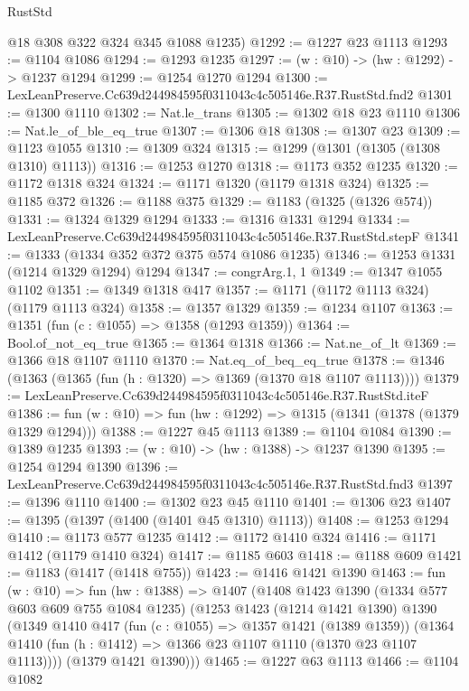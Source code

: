 \begin{lexlean}{RustStd}
\begin{coremodule}
      @18
      @308
      @322
      @324
      @345
      @1088
      @1235)
@1292 := @1227 @23 @1113
@1293 := @1104 @1086
@1294 := @1293 @1235
@1297 := (w : @10) -> (hw : @1292) -> @1237 @1294
@1299 := @1254 @1270 @1294
@1300 := LexLeanPreserve.Cc639d244984595f0311043c4c505146e.R37.RustStd.fnd2
@1301 := @1300 @1110
@1302 := Nat.le_trans
@1305 := @1302 @18 @23 @1110
@1306 := Nat.le_of_ble_eq_true
@1307 := @1306 @18
@1308 := @1307 @23
@1309 := @1123 @1055
@1310 := @1309 @324
@1315 := @1299 (@1301 (@1305 (@1308 @1310) @1113))
@1316 := @1253 @1270
@1318 := @1173 @352 @1235
@1320 := @1172 @1318 @324
@1324 := @1171 @1320 (@1179 @1318 @324)
@1325 := @1185 @372
@1326 := @1188 @375
@1329 := @1183 (@1325 (@1326 @574))
@1331 := @1324 @1329 @1294
@1333 := @1316 @1331 @1294
@1334 := LexLeanPreserve.Cc639d244984595f0311043c4c505146e.R37.RustStd.stepF
@1341 := @1333 (@1334 @352 @372 @375 @574 @1086 @1235)
@1346 := @1253 @1331 (@1214 @1329 @1294) @1294
@1347 := congrArg.{1, 1}
@1349 := @1347 @1055 @1102
@1351 := @1349 @1318 @417
@1357 := @1171 (@1172 @1113 @324) (@1179 @1113 @324)
@1358 := @1357 @1329
@1359 := @1234 @1107
@1363 := @1351 (fun (c : @1055) => @1358 (@1293 @1359))
@1364 := Bool.of_not_eq_true
@1365 := @1364 @1318
@1366 := Nat.ne_of_lt
@1369 := @1366 @18 @1107 @1110
@1370 := Nat.eq_of_beq_eq_true
@1378 := @1346 (@1363 (@1365 (fun (h : @1320) => @1369 (@1370 @18 @1107 @1113))))
@1379 := LexLeanPreserve.Cc639d244984595f0311043c4c505146e.R37.RustStd.iteF
@1386 := fun (w : @10) => fun (hw : @1292) => @1315 (@1341 (@1378 (@1379 @1329 @1294)))
@1388 := @1227 @45 @1113
@1389 := @1104 @1084
@1390 := @1389 @1235
@1393 := (w : @10) -> (hw : @1388) -> @1237 @1390
@1395 := @1254 @1294 @1390
@1396 := LexLeanPreserve.Cc639d244984595f0311043c4c505146e.R37.RustStd.fnd3
@1397 := @1396 @1110
@1400 := @1302 @23 @45 @1110
@1401 := @1306 @23
@1407 := @1395 (@1397 (@1400 (@1401 @45 @1310) @1113))
@1408 := @1253 @1294
@1410 := @1173 @577 @1235
@1412 := @1172 @1410 @324
@1416 := @1171 @1412 (@1179 @1410 @324)
@1417 := @1185 @603
@1418 := @1188 @609
@1421 := @1183 (@1417 (@1418 @755))
@1423 := @1416 @1421 @1390
@1463 := fun (w : @10) =>
  fun (hw : @1388) =>
  @1407
    (@1408
      @1423
      @1390
      (@1334 @577 @603 @609 @755 @1084 @1235)
      (@1253
        @1423
        (@1214 @1421 @1390)
        @1390
        (@1349
          @1410
          @417
          (fun (c : @1055) => @1357 @1421 (@1389 @1359))
          (@1364 @1410 (fun (h : @1412) => @1366 @23 @1107 @1110 (@1370 @23 @1107 @1113))))
        (@1379 @1421 @1390)))
@1465 := @1227 @63 @1113
@1466 := @1104 @1082

\end{coremodule}
\end{lexlean}
